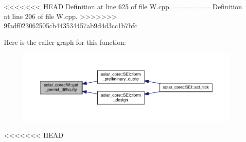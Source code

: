 <<<<<<< HEAD
Definition at line 625 of file W.\+cpp.
=======
Definition at line 206 of file W.\+cpp.
>>>>>>> 9fadf023062505cb443534457ab9d4d3cc1b7bfc



Here is the caller graph for this function\+:
\nopagebreak
\begin{figure}[H]
\begin{center}
\leavevmode
\includegraphics[width=350pt]{classsolar__core_1_1_w_a7906874c5180d8114e1acba095ace3f5_icgraph}
\end{center}
\end{figure}


<<<<<<< HEAD
\hypertarget{classsolar__core_1_1_w_af3adfe566e6db1a7f7df18aa7df22c25}{}
